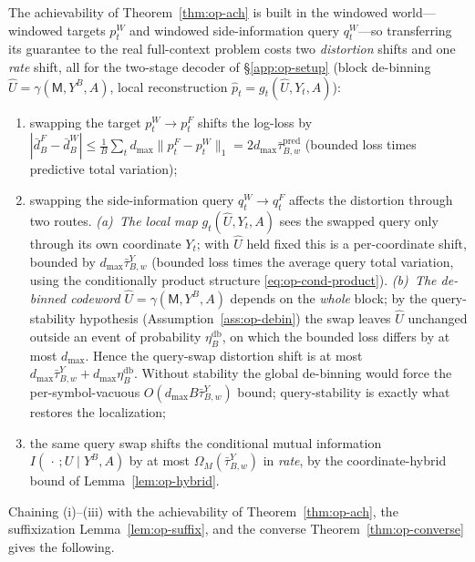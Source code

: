\documentclass[11pt]{article}
\newcommand{\phat}{\hat{p}}
\theoremstyle{plain}
\theoremstyle{definition}
\theoremstyle{remark}
\begin{document}
The achievability of Theorem~\ref{thm:op-ach} is built in the windowed
world---windowed targets $p_t^W$ and windowed side-information query
$q_t^W$---so transferring its guarantee to the real full-context
problem costs two \emph{distortion} shifts and one \emph{rate} shift,
all for the two-stage decoder of \S\ref{app:op-setup} (block
de-binning $\hat U=\gamma(\mathsf M,Y^B,A)$, local reconstruction
$\phat_t=g_t(\hat U,Y_t,A)$):
\begin{enumerate}[label=(\roman*),leftmargin=*,itemsep=1pt,topsep=2pt]
\item swapping the target $p_t^W\to p_t^F$ shifts the log-loss by
$|\bar d_B^{F}-\bar d_B^{W}|\le\frac1B\sum_t d_{\max}\|p_t^F-p_t^W\|_{1}
=2d_{\max}\bar\tau^{\mathrm{pred}}_{B,w}$ (bounded loss times predictive
total variation);
\item swapping the side-information query $q_t^W\to q_t^F$ affects the
distortion through two routes. \emph{(a)~The local map}
$g_t(\hat U,Y_t,A)$ sees the swapped query only through its own
coordinate $Y_t$; with $\hat U$ held fixed this is a per-coordinate
shift, bounded by $d_{\max}\bar\tau^{Y}_{B,w}$ (bounded loss times the
average query total variation, using the conditionally product
structure \eqref{eq:op-cond-product}). \emph{(b)~The de-binned
codeword} $\hat U=\gamma(\mathsf M,Y^B,A)$ depends on the \emph{whole}
block; by the query-stability hypothesis
(Assumption~\ref{ass:op-debin}) the swap leaves $\hat U$ unchanged
outside an event of probability $\eta_B^{\mathrm{db}}$, on which the
bounded loss differs by at most $d_{\max}$. Hence the query-swap
distortion shift is at most
$d_{\max}\bar\tau^{Y}_{B,w}+d_{\max}\eta_B^{\mathrm{db}}$. Without
stability the global de-binning would force the per-symbol-vacuous
$O(d_{\max}B\bar\tau^{Y}_{B,w})$ bound; query-stability is exactly
what restores the localization;
\item the same query swap shifts the conditional mutual information
$I(\,\cdot\,;U\mid Y^B,A)$ by at most $\Omega_M(\bar\tau^Y_{B,w})$ in
\emph{rate}, by the coordinate-hybrid bound of
Lemma~\ref{lem:op-hybrid}.
\end{enumerate}
Chaining (i)--(iii) with the achievability of
Theorem~\ref{thm:op-ach}, the suffixization
Lemma~\ref{lem:op-suffix}, and the converse
Theorem~\ref{thm:op-converse} gives the following.
\end{document}
